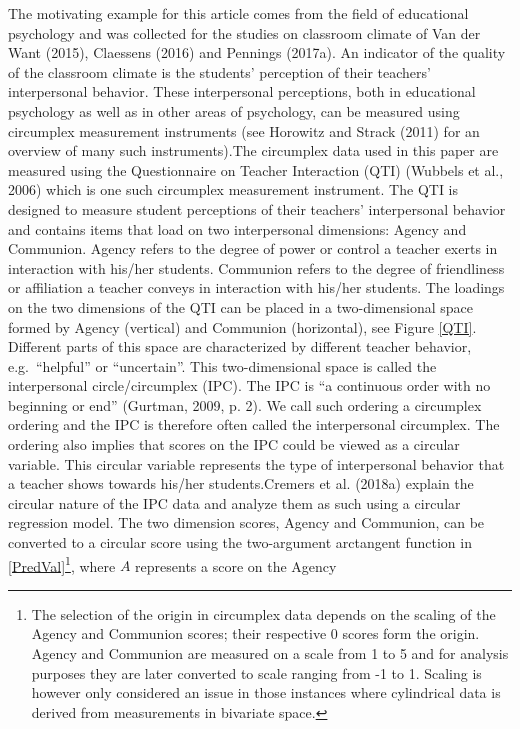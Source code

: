 \documentclass[man]{apa6}
\let\rmarkdownfootnote\footnote%
\def\footnote{\protect\rmarkdownfootnote}
\DeclareRobustCommand{\VANDER}[3]{#2}
\theoremstyle{definition}
\theoremstyle{definition}
\theoremstyle{definition}
\theoremstyle{remark}
\begin{document}
The motivating example for this article comes from the field of
educational psychology and was collected for the studies on classroom
climate of \VANDER{Want}{Van der}{van der} Want (2015), Claessens (2016)
and Pennings (2017a). An indicator of the quality of the classroom
climate is the students' perception of their teachers' interpersonal
behavior. These interpersonal perceptions, both in educational
psychology as well as in other areas of psychology, can be measured
using circumplex measurement instruments (see Horowitz and Strack (2011)
for an overview of many such instruments).\newline \indent The
circumplex data used in this paper are measured using the Questionnaire
on Teacher Interaction (QTI) (Wubbels et al., 2006) which is one such
circumplex measurement instrument. The QTI is designed to measure
student perceptions of their teachers' interpersonal behavior and
contains items that load on two interpersonal dimensions: Agency and
Communion. Agency refers to the degree of power or control a teacher
exerts in interaction with his/her students. Communion refers to the
degree of friendliness or affiliation a teacher conveys in interaction
with his/her students. The loadings on the two dimensions of the QTI can
be placed in a two-dimensional space formed by Agency (vertical) and
Communion (horizontal), see Figure \ref{QTI}. Different parts of this
space are characterized by different teacher behavior,
e.g.~\enquote{helpful} or \enquote{uncertain}. This two-dimensional
space is called the interpersonal circle/circumplex (IPC). The IPC is
``a continuous order with no beginning or end'' (Gurtman, 2009, p. 2).
We call such ordering a circumplex ordering and the IPC is therefore
often called the interpersonal circumplex. The ordering also implies
that scores on the IPC could be viewed as a circular variable. This
circular variable represents the type of interpersonal behavior that a
teacher shows towards his/her students.\newline \indent Cremers et al.
(2018a) explain the circular nature of the IPC data and analyze them as
such using a circular regression model. The two dimension scores, Agency
and Communion, can be converted to a circular score using the
two-argument arctangent function in
\eqref{PredVal}\footnote{The selection of
the origin in circumplex data depends on the scaling of the Agency and Communion
scores; their respective 0 scores form the origin. Agency and Communion are
measured on a scale from 1 to 5 and for analysis purposes they are later
converted to scale ranging from -1 to 1. Scaling is however only considered an
issue in those instances where cylindrical data is derived from measurements in
bivariate space.}, where \(A\) represents a score on the Agency
\end{document}
